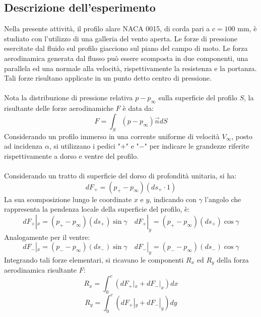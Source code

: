 \subsection{Descrizione dell'esperimento}
Nella presente attività, il profilo alare NACA 0015, di corda pari a $c=100$ mm, è studiato con l'utilizzo di una galleria del vento aperta. Le forze di pressione esercitate dal fluido sul profilo giacciono sul piano del campo di moto. Le forza aerodinamica generata dal flusso può essere scomposta in due componenti, una parallela ed una normale alla velocità, rispettivamente la resistenza e la portanza. Tali forze risultano applicate in un punto detto centro di pressione.\\\\
Nota la distribuzione di pressione relativa $p-p_\infty$ sulla superficie del profilo $S$, la risultante delle forze aerodinamiche $F$ è data da:
\begin{equation*}
    F = \int_S (p-p_\infty)\vec n dS
\end{equation*}
Considerando un profilo immerso in una corrente uniforme di velocità $V_\infty$, posto ad incidenza $\alpha$, si utilizzano i pedici "$+$" e "$-$" per indicare le grandezze riferite rispettivamente a dorso e ventre del profilo.\\\\
Considerando un tratto di superficie del dorso di profondità unitaria, si ha:
\begin{equation*}
    dF_+ = (p_+ - p_\infty)(ds_+ \cdot 1)
\end{equation*}
La sua scomposizione lungo le coordinate $x$ e $y$, indicando con $\gamma$ l'angolo che rappresenta la pendenza locale della superficie del profilo, è:
\begin{equation*}
    dF_+|_x = (p_+ - p_\infty)(ds_+)\sin \gamma \quad dF_+|_y = (p_+ - p_\infty)(ds_+)\cos \gamma
\end{equation*}
Analogamente per il ventre:
\begin{equation*}
    dF_-|_x = (p_- - p_\infty)(ds_-)\sin \gamma \quad dF_-|_y = (p_- - p_\infty)(ds_-)\cos \gamma
\end{equation*}
Integrando tali forze elementari, si ricavano le componenti $R_x$ ed $R_y$ della forza aerodinamica risultante $F$:
\begin{equation*}
    R_x = \int_0^c (dF_+|_x + dF_-|_x)dx
\end{equation*}
\begin{equation*}
    R_y = \int_0^c (dF_+|_y + dF_-|_y)dy
\end{equation*}
